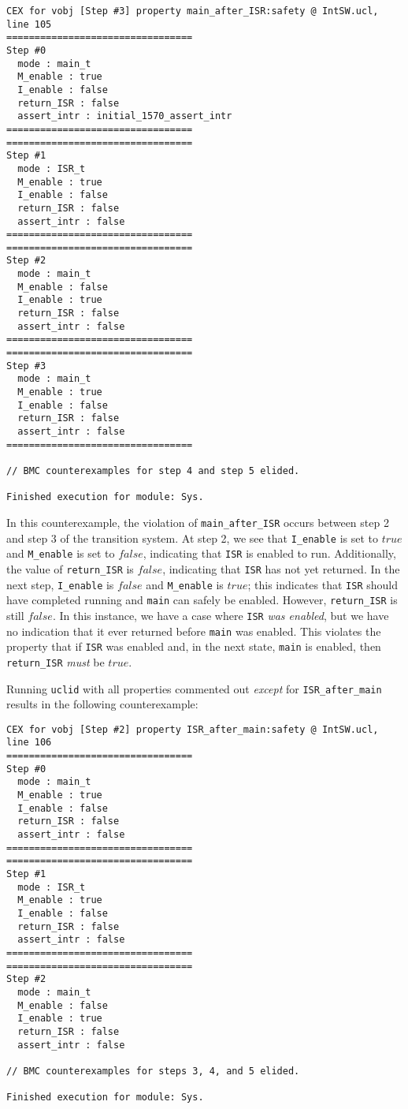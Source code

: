 \documentclass{article}
\newcommand{\code}[1]{\texttt{#1}}
\begin{document}
\begin{lstlisting}
CEX for vobj [Step #3] property main_after_ISR:safety @ IntSW.ucl, line 105
=================================
Step #0
  mode : main_t
  M_enable : true
  I_enable : false
  return_ISR : false
  assert_intr : initial_1570_assert_intr
=================================
=================================
Step #1
  mode : ISR_t
  M_enable : true
  I_enable : false
  return_ISR : false
  assert_intr : false
=================================
=================================
Step #2
  mode : main_t
  M_enable : false
  I_enable : true
  return_ISR : false
  assert_intr : false
=================================
=================================
Step #3
  mode : main_t
  M_enable : true
  I_enable : false
  return_ISR : false
  assert_intr : false
=================================

// BMC counterexamples for step 4 and step 5 elided.

Finished execution for module: Sys.
\end{lstlisting}

In this counterexample, the violation of \code{main\_after\_ISR} occurs between step 2 and step 3 of the transition system. At step 2, we see that \code{I\_enable} is set to $true$ and \code{M\_enable} is set to $false$, indicating that \code{ISR} is enabled to run. Additionally, the value of \code{return\_ISR} is $false$, indicating that \code{ISR} has not yet returned. In the next step, \code{I\_enable} is $false$ and \code{M\_enable} is $true$; this indicates that \code{ISR} should have completed running and \code{main} can safely be enabled. However, \code{return\_ISR} is still $false$. In this instance, we have a case where \code{ISR} \emph{was enabled}, but we have no indication that it ever returned before \code{main} was enabled. This violates the property that if \code{ISR} was enabled and, in the next state, \code{main} is enabled, then \code{return\_ISR} \emph{must} be $true$.

Running \code{uclid} with all properties commented out \emph{except} for \code{ISR\_after\_main} results in the following counterexample:

\begin{lstlisting}
CEX for vobj [Step #2] property ISR_after_main:safety @ IntSW.ucl, line 106
=================================
Step #0
  mode : main_t
  M_enable : true
  I_enable : false
  return_ISR : false
  assert_intr : false
=================================
=================================
Step #1
  mode : ISR_t
  M_enable : true
  I_enable : false
  return_ISR : false
  assert_intr : false
=================================
=================================
Step #2
  mode : main_t
  M_enable : false
  I_enable : true
  return_ISR : false
  assert_intr : false

// BMC counterexamples for steps 3, 4, and 5 elided.

Finished execution for module: Sys.
\end{lstlisting}
\end{document}
